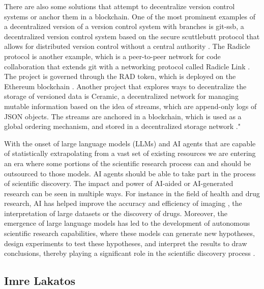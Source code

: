 There are also some solutions that attempt to decentralize version control systems or anchor them in a blockchain. One of the most prominent examples of a decentralized version of a version control system with branches is git-ssb, a decentralized version control system based on the secure scuttlebutt protocol that allows for distributed version control without a central authority \cite{gitssb}. The Radicle protocol is another example, which is a peer-to-peer network for code collaboration that extends git with a networking protocol called Radicle Link \cite{radicle}. The project is governed through the RAD token, which is deployed on the Ethereum blockchain \cite{buterin2013ethereum}. Another project that explores ways to decentralize the storage of versioned data is Ceramic, a decentralized network for managing mutable information based on the idea of streams, which are append-only logs of JSON objects. The streams are anchored in a blockchain, which is used as a global ordering mechanism, and stored in a decentralized storage network \cite{ceramic}."

With the onset of large language models (LLMs) and AI agents that are capable of statistically extrapolating from a vast set of existing resources we are entering an era where some portions of the scientific research process can and should be outsourced to those models. AI agents should be able to take part in the process of scientific discovery. The impact and power of AI-aided or AI-generated research can be seen in multiple ways. For instance in the field of health and drug research, AI has helped improve the accuracy and efficiency of imaging \cite{Topol2019}, the interpretation of large datasets \cite{Libbrecht2015,Kraus2019,Holzinger2019} or the discovery of drugs\cite{AlQuraishi2019}. Moreover, the emergence of large language models has led to the development of autonomous scientific research capabilities, where these models can generate new hypotheses, design experiments to test these hypotheses, and interpret the results to draw conclusions, thereby playing a significant role in the scientific discovery process \cite{EmergentAutonomous2023}.


\subsection{Imre Lakatos}

